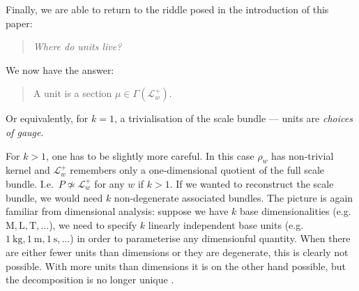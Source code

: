 \documentclass[12pt]{article}
\numberwithin{equation}{section}
\newcommand{\R}{\mathbb{R}}
\newcommand{\N}{\mathbb{N}}
\newtheorem{proposition}[theorem]{Proposition}
\begin{document}
Finally, we are able to return to the riddle posed in the introduction of this paper: 
\vspace{6pt}
\begin{quote}
    \centering \emph{Where do units live?}
\end{quote}
\vspace{6pt}
We now have the answer:
\vspace{6pt}
\begin{quote}
    \centering A unit is a section $\mu\in \Gamma(\mathcal{L}_w^+)$.
\end{quote}
\vspace{6pt}
Or equivalently, for $k=1$, a trivialisation of the scale bundle --- units are \emph{choices of gauge}.

For $k>1$, one has to be slightly more careful. In this case $\rho_w$ has non-trivial kernel and $\mathcal{L}_w^+$ remembers only a one-dimensional quotient of the full scale bundle. I.e.~$P\not\simeq \mathcal{L}_w^+$ for any $w$ if $k>1$. If we wanted to reconstruct the scale bundle, we would need $k$ non-degenerate associated bundles. The picture is again familiar from dimensional analysis: suppose we have $k$ base dimensionalities (e.g.~$\mathrm{M},\mathrm{L},\mathrm{T},\dots$), we need to specify $k$ linearly independent base units (e.g.~$\SI{1}{\kg},\SI{1}{\meter},\SI{1}{\second},\dots$) in order to parameterise any dimensionful quantity. When there are either fewer units than dimensions or they are degenerate, this is clearly not possible. With more units than dimensions it is on the other hand possible, but the decomposition is no longer unique \citep{Jacobs2024}.

\end{document}

